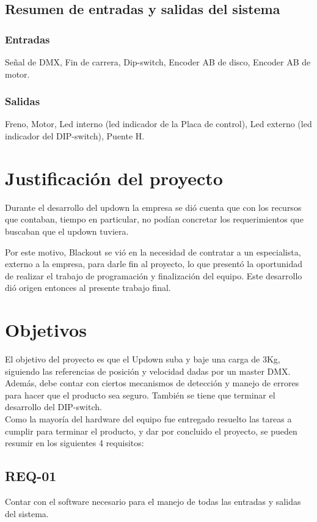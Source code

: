 \subsection{Resumen de entradas y salidas del sistema}
\subsubsection{Entradas} 
Señal de DMX, Fin de carrera, Dip-switch, Encoder AB de disco, Encoder AB de motor.
\subsubsection{Salidas}
Freno, Motor, Led interno (led indicador de la Placa de control), Led externo (led indicador del DIP-switch), Puente H.

\section{Justificación del proyecto} \label{sec:\thesection}
Durante el desarrollo del updown la empresa se dió cuenta que con los recursos que contaban, tiempo en particular, no podían concretar los requerimientos que buscaban que el updown tuviera. 

Por este motivo, Blackout se vió en la necesidad de contratar a un especialista, externo a la empresa, para darle fin al proyecto, lo que presentó la oportunidad de realizar el trabajo de programación y finalización del equipo. Este desarrollo dió origen entonces al presente trabajo final.

\newpage
\section{Objetivos} \label{sec:\thesection}
El objetivo del proyecto es que el Updown suba y baje una carga de 3Kg, siguiendo las referencias de posición y velocidad dadas por un master DMX. Además, debe contar con ciertos mecanismos de detección y manejo de errores para hacer que el producto sea seguro. También se tiene que terminar el desarrollo del DIP-switch.\\
Como la mayoría del hardware del equipo fue entregado resuelto las tareas a cumplir para terminar el producto, y dar por concluido el proyecto, se pueden resumir en los siguientes 4 requisitos:

\subsection{REQ-01}
Contar con el software necesario para el manejo de todas las entradas y salidas del sistema.

